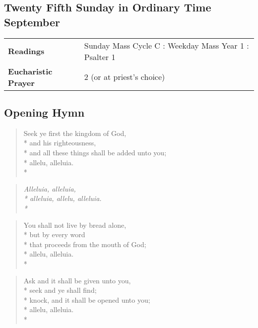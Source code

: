 \documentclass[12pt]{article}
\newcounter{count}
\newcommand\printcount{\addtocounter{count}{1}\thecount}
\begin{document}
\begin{center}
\section*{Twenty Fifth Sunday in Ordinary Time\\ September}

\begin{tabular}{ |l|l| }
\hline
\textbf{Readings} & Sunday Mass Cycle C : Weekday Mass Year 1 : Psalter 1\\
\textbf{Eucharistic Prayer} & 2 (or at priest’s choice)\\
\hline
\end{tabular}
\end{center}

\begin{center}
\subsection*{Opening Hymn}
\end{center}
\begin{multicols}{2}
\setcounter{count}{0}
\setcounter{count}{0}
\begin{verse}
\flagverse{\printcount.} Seek ye first the kingdom of God,\\*
and his righteousness,\\*
and all these things shall be added unto you;\\*
allelu, alleluia.\\*
\end{verse}

\begin{verse}
\textit{Alleluia, alleluia,\\*
alleluia, allelu, alleluia.\\*}
\end{verse}

\begin{verse}
\flagverse{\printcount.} You shall not live by bread alone,\\*
but by every word\\*
that proceeds from the mouth of God;\\*
allelu, alleluia.\\*
\end{verse}

\begin{verse}
\flagverse{\printcount.} Ask and it shall be given unto you,\\*
seek and ye shall find;\\*
knock, and it shall be opened unto you;\\*
allelu, alleluia.\\*
\end{verse}
\end{multicols}
\end{document}
